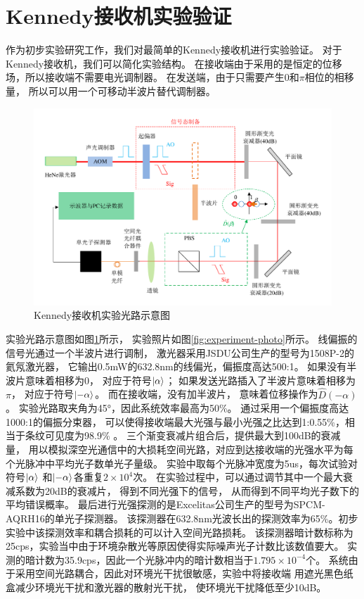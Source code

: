 \section{Kennedy接收机实验验证}

作为初步实验研究工作，我们对最简单的Kennedy接收机进行实验验证。
对于Kennedy接收机，我们可以简化实验结构。
在接收端由于采用的是恒定的位移场，所以接收端不需要电光调制器。
在发送端，由于只需要产生$0$和$\pi$相位的相移量，
所以可以用一个可移动半波片替代调制器。




\begin{figure}
\centering
  \includegraphics[width=\textwidth]{figures/chap5/Kennedy-receiver-diagram}
  \caption{Kennedy接收机实验光路示意图}
  \label{fig:Kennedy-receiver-diagram}
\end{figure}

实验光路示意图如图\ref{fig:Kennedy-receiver-diagram}所示，
实验照片如图\ref{fig:experiment-photo}所示。
线偏振的信号光通过一个半波片进行调制，
激光器采用JSDU公司生产的型号为1508P-2的氦氖激光器，
它输出0.5mW的632.8nm的线偏光，偏振度高达500:1。 
如果没有半波片意味着相移为$0$，
对应于符号$\ket{\alpha}$；
如果发送光路插入了半波片意味着相移为$\pi$，
对应于符号$\ket{-\alpha}$。
而在接收端，没有加半波片，
意味着位移操作为$\hat{D}(-\alpha)$。
实验光路取夹角为45°，因此系统效率最高为50\%。
通过采用一个偏振度高达1000:1的偏振分束器，
可以使得接收端最大光强与最小光强之比达到1:0.55\%，相当于条纹可见度为98.9\% 。
三个渐变衰减片组合后，提供最大到100dB的衰减量，
用以模拟深空光通信中的大损耗空间光路，对应到达接收端的光强水平为每个光脉冲中平均光子数单光子量级。
实验中取每个光脉冲宽度为5us，每次试验对符号$\ket{\alpha}$
和$\ket{-\alpha}$各重复$2\times 10^4$次。
在实验过程中，可以通过调节其中一个最大衰减系数为20dB的衰减片，
得到不同光强下的信号，
从而得到不同平均光子数下的平均错误概率。
最后进行光强探测的是Excelitas公司生产的型号为SPCM-AQRH16的单光子探测器。
该探测器在632.8nm光波长出的探测效率为65\%。初步实验中该探测效率和耦合损耗的可以计入空间光路损耗。
该探测器暗计数标称为25cps，实验当中由于环境杂散光等原因使得实际噪声光子计数比该数值要大。
实测的暗计数为35.9cps，因此一个光脉冲内的暗计数相当于$1.795\times 10^{-4}$个。
系统由于采用空间光路耦合，因此对环境光干扰很敏感，实验中将接收端
用遮光黑色纸盒减少环境光干扰和激光器的散射光干扰，
使环境光干扰降低至少10dB。



